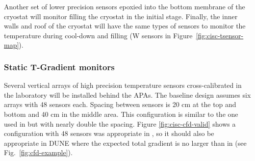 

Another set of lower precision sensors epoxied into the bottom membrane of the cryostat will monitor filling the cryostat in the initial stage.   
Finally, the inner walls and roof of the cryostat will have the same types of sensors to monitor the temperature during cool-down and filling (W sensors in Figure~\ref{fig:cisc-tsensor-map}).
 
 

\subsubsection{Static T-Gradient monitors}

Several vertical arrays of high precision temperature sensors cross-calibrated in the laboratory will be installed behind the APAs.  
The baseline design assumes six arrays with 48 sensors each. Spacing between sensors
is 20 cm at the top and bottom and 40 cm in the middle area. This configuration is similar to the one used in  but with nearly double the spacing. Figure \ref{fig:cisc-cfd-valid} shows a configuration with 48 sensors was appropriate in , so it should also be appropriate in DUNE where the expected total gradient is no larger than in  (see Fig.~\ref{fig:cfd-example}). 

